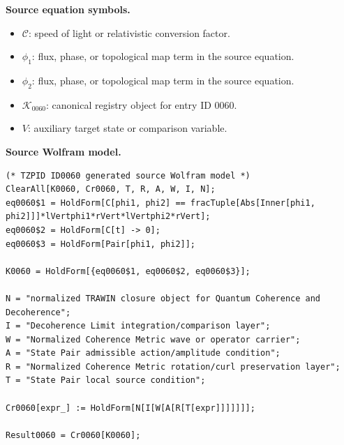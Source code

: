 \begin{minipage}[t]{0.49\linewidth}
\begingroup
\small
\raggedright
\textbf{Source equation symbols.}\par
\begin{itemize}[leftmargin=1.35em,itemsep=1pt,topsep=1pt,parsep=0pt]
    \item $\mathcal{C}$: speed of light or relativistic conversion factor.
    \item $\phi_{1}$: flux, phase, or topological map term in the source equation.
    \item $\phi_{2}$: flux, phase, or topological map term in the source equation.
    \item $\mathcal{K}_{0060}$: canonical registry object for entry ID 0060.
    \item $V$: auxiliary target state or comparison variable.
\end{itemize}
\endgroup
\end{minipage}\hfill
\begin{minipage}[t]{0.47\linewidth}
\begingroup
\scriptsize
\raggedright
\textbf{Source Wolfram model.}\par
\begin{Verbatim}[fontsize=\tiny,breaklines=true,breakanywhere=true]
(* TZPID ID0060 generated source Wolfram model *)
ClearAll[K0060, Cr0060, T, R, A, W, I, N];
eq0060$1 = HoldForm[C[phi1, phi2] == fracTuple[Abs[Inner[phi1, phi2]]]*lVertphi1*rVert*lVertphi2*rVert];
eq0060$2 = HoldForm[C[t] -> 0];
eq0060$3 = HoldForm[Pair[phi1, phi2]];

K0060 = HoldForm[{eq0060$1, eq0060$2, eq0060$3}];

N = "normalized TRAWIN closure object for Quantum Coherence and Decoherence";
I = "Decoherence Limit integration/comparison layer";
W = "Normalized Coherence Metric wave or operator carrier";
A = "State Pair admissible action/amplitude condition";
R = "Normalized Coherence Metric rotation/curl preservation layer";
T = "State Pair local source condition";

Cr0060[expr_] := HoldForm[N[I[W[A[R[T[expr]]]]]]];

Result0060 = Cr0060[K0060];
\end{Verbatim}
\endgroup
\end{minipage}

